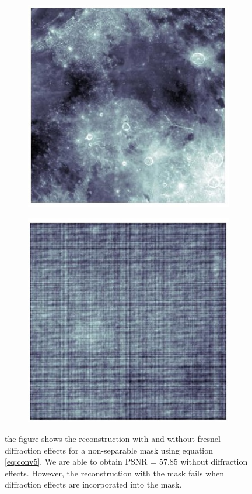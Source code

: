   \begin{figure}[ht]
    \centering
    \begin{subfigure}{0.5\textwidth}
    \centering
        \includegraphics[scale = 0.5]{pics/rec_non_sep}
    
    \end{subfigure}%
    \begin{subfigure}{0.5\textwidth}
    \centering
        \includegraphics[scale= 0.5]{pics/rec_non_sep_diff}
    \end{subfigure}
    \caption{the figure shows the reconstruction with and without fresnel diffraction effects for a non-separable mask using equation \ref{eq:conv5}. We are able to obtain PSNR = 57.85 without diffraction effects. However, the reconstruction with the mask fails when diffraction effects are incorporated into the mask. }
    \label{fig:rec_non_sep}
    \end{figure}
    
